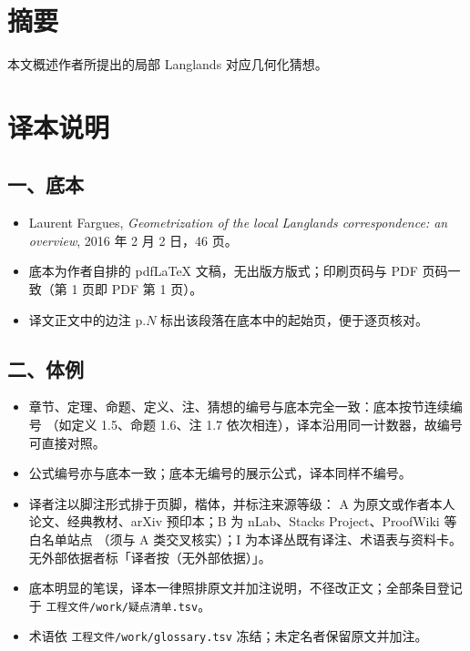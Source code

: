 
\section*{摘要}

本文概述作者所提出的局部 Langlands 对应几何化猜想。

\section*{译本说明}

\subsection*{一、底本}

\begin{itemize}
\item Laurent Fargues, \emph{Geometrization of the local Langlands correspondence: an overview},
2016 年 2 月 2 日，46 页。
\item 底本为作者自排的 pdf\LaTeX{} 文稿，无出版方版式；印刷页码与 PDF 页码一致（第 1 页即 PDF 第 1 页）。
\item 译文正文中的边注 \textsf{p.$N$} 标出该段落在底本中的起始页，便于逐页核对。
\end{itemize}

\subsection*{二、体例}

\begin{itemize}
\item 章节、定理、命题、定义、注、猜想的编号与底本完全一致：底本按节连续编号
（如定义 1.5、命题 1.6、注 1.7 依次相连），译本沿用同一计数器，故编号可直接对照。
\item 公式编号亦与底本一致；底本无编号的展示公式，译本同样不编号。
\item 译者注以脚注形式排于页脚，楷体，并标注来源等级：
A 为原文或作者本人论文、经典教材、arXiv 预印本；B 为 nLab、Stacks Project、ProofWiki 等白名单站点
（须与 A 类交叉核实）；I 为本译丛既有译注、术语表与资料卡。无外部依据者标「译者按（无外部依据）」。
\item 底本明显的笔误，译本一律照排原文并加注说明，不径改正文；全部条目登记于
\texttt{工程文件/work/疑点清单.tsv}。
\item 术语依 \texttt{工程文件/work/glossary.tsv} 冻结；未定名者保留原文并加注。
\end{itemize}

